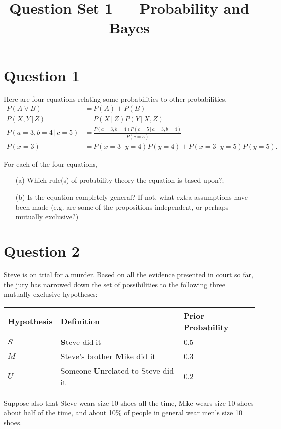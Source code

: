 \documentclass[a4paper, 12pt]{article}
\title{Question Set 1 --- Probability and Bayes}
\author{}
\date{}
\newcommand{\given}{\,|\,}
\begin{document}
\maketitle


\setlength{\parindent}{0pt}
\setlength{\parskip}{8pt}

\section*{Question 1}
Here are four equations relating some probabilities to other probabilities.
\begin{align}
P(A \vee B) &= P(A) + P(B) \\
P(X, Y \given Z) &= P(X \given Z)P(Y \given X, Z) \\
P(a=3, b=4 \given c=5) &= \frac{P(a=3, b=4)P(c = 5 \given a=3, b=4)}
                          {P(c=5)} \\
P(x=3) &= P(x=3 \given y=4)P(y=4) + P(x=3 \given y=5)P(y=5).
\end{align}

For each of the four equations,
\begin{enumerate}
\item[(a)] Which rule(s) of probability theory the equation is based upon?;
\item[(b)] Is the equation completely general? If not,
what extra assumptions have been made (e.g. are some of the
propositions independent, or perhaps mutually exclusive?)
\end{enumerate}

\section*{Question 2}

Steve is on trial for a murder. Based on all the evidence presented in court
so far, the jury has narrowed down the set of possibilities to the following
three mutually exclusive hypotheses:\\

\begin{center}
\begin{tabular}{|l|l|l|}
\hline
Hypothesis	&	Definition	  &	Prior Probability\\
\hline
$S$		& {\bf S}teve did it	         & 0.5 \\
$M$		& Steve's brother {\bf M}ike did it & 0.3 \\
$U$     & Someone {\bf U}nrelated to Steve did it & 0.2 \\
\hline
\end{tabular}
\end{center}
Suppose also that Steve wears size 10 shoes all the time,
Mike wears size 10 shoes about
half of the time, and about 10\% of people in general wear men's size 10 shoes.
\end{document}
